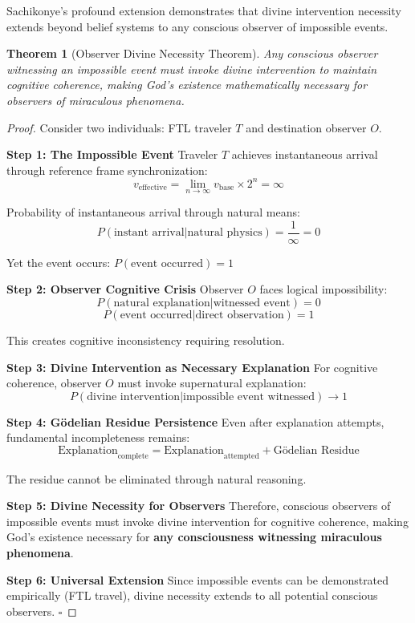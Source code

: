 \documentclass[12pt,a4paper]{article}
\newtheorem{theorem}{Theorem}[section]
\begin{document}
Sachikonye's profound extension \citep{sachikonye2024observer} demonstrates that divine intervention necessity extends beyond belief systems to any conscious observer of impossible events.

\begin{theorem}[Observer Divine Necessity Theorem]
Any conscious observer witnessing an impossible event must invoke divine intervention to maintain cognitive coherence, making God's existence mathematically necessary for observers of miraculous phenomena.
\end{theorem}

\begin{proof}
Consider two individuals: FTL traveler $T$ and destination observer $O$.

\textbf{Step 1: The Impossible Event}
Traveler $T$ achieves instantaneous arrival through reference frame synchronization:
$$v_{\text{effective}} = \lim_{n \to \infty} v_{\text{base}} \times 2^n = \infty$$

Probability of instantaneous arrival through natural means:
$$P(\text{instant arrival}|\text{natural physics}) = \frac{1}{\infty} = 0$$

Yet the event occurs: $P(\text{event occurred}) = 1$

\textbf{Step 2: Observer Cognitive Crisis}
Observer $O$ faces logical impossibility:
$$P(\text{natural explanation}|\text{witnessed event}) = 0$$
$$P(\text{event occurred}|\text{direct observation}) = 1$$

This creates cognitive inconsistency requiring resolution.

\textbf{Step 3: Divine Intervention as Necessary Explanation}
For cognitive coherence, observer $O$ must invoke supernatural explanation:
$$P(\text{divine intervention}|\text{impossible event witnessed}) \to 1$$

\textbf{Step 4: Gödelian Residue Persistence}
Even after explanation attempts, fundamental incompleteness remains:
$$\text{Explanation}_{\text{complete}} = \text{Explanation}_{\text{attempted}} + \text{Gödelian Residue}$$

The residue cannot be eliminated through natural reasoning.

\textbf{Step 5: Divine Necessity for Observers}
Therefore, conscious observers of impossible events must invoke divine intervention for cognitive coherence, making God's existence necessary for \textbf{any consciousness witnessing miraculous phenomena}.

\textbf{Step 6: Universal Extension}
Since impossible events can be demonstrated empirically (FTL travel), divine necessity extends to all potential conscious observers. $\square$
\end{proof}
\end{document}
